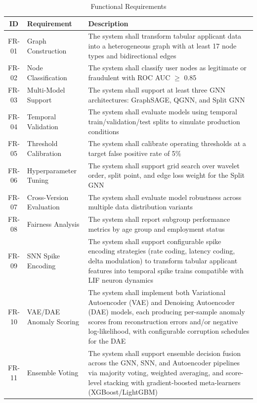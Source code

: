 \begin{table}[H]
\centering
\caption{Functional Requirements}
\label{tab:functional-reqs}
\small
\begin{tabularx}{\textwidth}{clL}
\toprule
\textbf{ID} & \textbf{Requirement} & \textbf{Description} \\
\midrule
FR-01 & Graph Construction & The system shall transform tabular applicant data into a heterogeneous graph with at least 17 node types and bidirectional edges \\
FR-02 & Node Classification & The system shall classify user nodes as legitimate or fraudulent with ROC AUC $\geq$ 0.85 \\
FR-03 & Multi-Model Support & The system shall support at least three GNN architectures: GraphSAGE, QGNN, and Split GNN \\
FR-04 & Temporal Validation & The system shall evaluate models using temporal train/validation/test splits to simulate production conditions \\
FR-05 & Threshold Calibration & The system shall calibrate operating thresholds at a target false positive rate of 5\% \\
FR-06 & Hyperparameter Tuning & The system shall support grid search over wavelet order, split point, and edge loss weight for the Split GNN \\
FR-07 & Cross-Version Evaluation & The system shall evaluate model robustness across multiple data distribution variants \\
FR-08 & Fairness Analysis & The system shall report subgroup performance metrics by age group and employment status \\
FR-09 & SNN Spike Encoding & The system shall support configurable spike encoding strategies (rate coding, latency coding, delta modulation) to transform tabular applicant features into temporal spike trains compatible with LIF neuron dynamics \\
FR-10 & VAE/DAE Anomaly Scoring & The system shall implement both Variational Autoencoder (VAE) and Denoising Autoencoder (DAE) models, each producing per-sample anomaly scores from reconstruction errors and/or negative log-likelihood, with configurable corruption schedules for the DAE \\
FR-11 & Ensemble Voting & The system shall support ensemble decision fusion across the GNN, SNN, and Autoencoder pipelines via majority voting, weighted averaging, and score-level stacking with gradient-boosted meta-learners (XGBoost/LightGBM) \\
\bottomrule
\end{tabularx}
\end{table}

